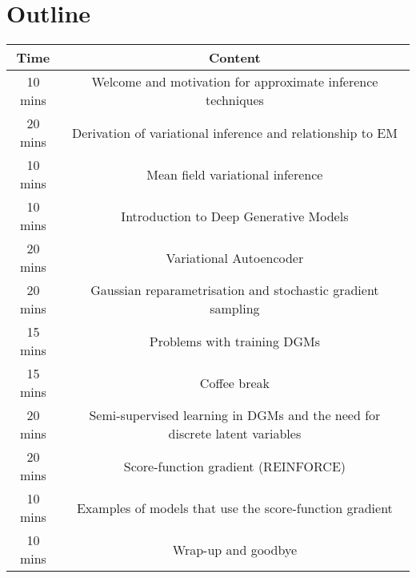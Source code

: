 \section{Outline}

\begin{table}[h!]
\begin{tabular}{|c|c|}
\hline
\textbf{Time} & \textbf{Content} \\
\hline \hline
10 mins & Welcome and motivation for approximate inference techniques \\
20 mins & Derivation of variational inference and relationship to EM \\
10 mins & Mean field variational inference \\
\hline
10 mins & Introduction to Deep Generative Models \\
20 mins & Variational Autoencoder \\
20 mins & Gaussian reparametrisation and stochastic gradient sampling \\
15 mins & Problems with training DGMs \\
\hline \hline
15 mins & Coffee break \\
\hline \hline
20 mins & Semi-supervised learning in DGMs and the need for discrete latent variables \\
20 mins & Score-function gradient (REINFORCE) \\
10 mins & Examples of models that use the score-function gradient \\
\hline \hline
10 mins & Wrap-up and goodbye \\
\hline
\end{tabular}
\end{table}